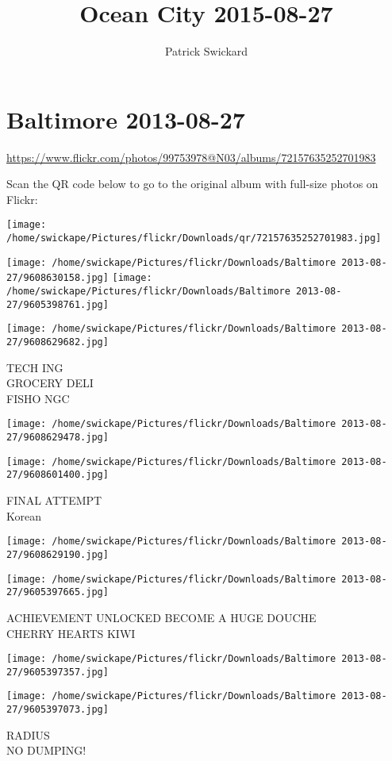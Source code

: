 \documentclass[10pt,letterpaper]{article}
\title{Ocean City 2015-08-27}
\author{Patrick Swickard}
\date{}
\begin{document}
\section*{Baltimore 2013-08-27}

\url{https://www.flickr.com/photos/99753978@N03/albums/72157635252701983}

Scan the QR code below to go to the original album with full-size photos on Flickr:

\texttt{[image: /home/swickape/Pictures/flickr/Downloads/qr/72157635252701983.jpg]}
\pagebreak

\texttt{[image: /home/swickape/Pictures/flickr/Downloads/Baltimore 2013-08-27/9608630158.jpg]}
\texttt{[image: /home/swickape/Pictures/flickr/Downloads/Baltimore 2013-08-27/9605398761.jpg]}

\texttt{[image: /home/swickape/Pictures/flickr/Downloads/Baltimore 2013-08-27/9608629682.jpg]}

TECH ING\\
GROCERY DELI\\
FISHO NGC
\pagebreak

\texttt{[image: /home/swickape/Pictures/flickr/Downloads/Baltimore 2013-08-27/9608629478.jpg]}

\vspace{0.25in}
\texttt{[image: /home/swickape/Pictures/flickr/Downloads/Baltimore 2013-08-27/9608601400.jpg]}

FINAL ATTEMPT\\
Korean
\pagebreak

\texttt{[image: /home/swickape/Pictures/flickr/Downloads/Baltimore 2013-08-27/9608629190.jpg]}

\vspace{0.25in}
\texttt{[image: /home/swickape/Pictures/flickr/Downloads/Baltimore 2013-08-27/9605397665.jpg]}

ACHIEVEMENT UNLOCKED BECOME A HUGE DOUCHE\\
CHERRY HEARTS KIWI
\pagebreak

\texttt{[image: /home/swickape/Pictures/flickr/Downloads/Baltimore 2013-08-27/9605397357.jpg]}

\vspace{0.25in}
\texttt{[image: /home/swickape/Pictures/flickr/Downloads/Baltimore 2013-08-27/9605397073.jpg]}

RADIUS\\
NO DUMPING!
\pagebreak
\end{document}
